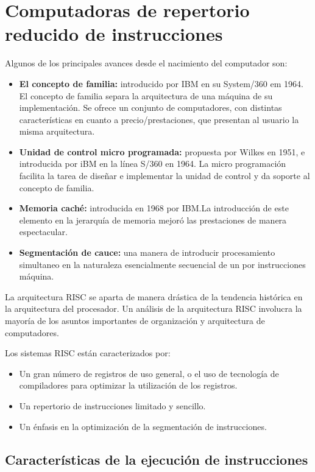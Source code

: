\section{Computadoras de repertorio reducido de instrucciones}

Algunos de los principales avances desde el nacimiento del computador son:

\begin{itemize}
  \item \textbf{El concepto de familia:} introducido por IBM en su System/360 em 1964. El concepto de familia separa la arquitectura de una máquina de su implementación. Se ofrece un conjunto de computadores, con distintas características en cuanto a precio/prestaciones, que presentan al usuario la misma arquitectura.
  \item \textbf{Unidad de control micro programada:} propuesta por Wilkes en 1951, e introducida por iBM en la línea S/360 en 1964. La micro programación facilita la tarea de diseñar e implementar la unidad de control y da soporte al concepto de familia.
  \item \textbf{Memoria caché:} introducida en 1968 por IBM.\@ La introducción de este elemento en la jerarquía de memoria mejoró las prestaciones de manera espectacular.
  \item \textbf{Segmentación de cauce:} una manera de introducir procesamiento simultaneo en la naturaleza esencialmente secuencial de un por instrucciones máquina.
\end{itemize}

La arquitectura RISC se aparta de manera drástica de la tendencia histórica en la arquitectura del procesador. Un análisis de la arquitectura RISC involucra la mayoría de los asuntos importantes de organización y arquitectura de computadores.

Los sistemas RISC están caracterizados por:

\begin{itemize}
  \item Un gran número de registros de uso general, o el uso de tecnología de compiladores para optimizar la utilización de los registros.
  \item Un repertorio de instrucciones limitado y sencillo.
  \item Un énfasis en la optimización de la segmentación de instrucciones.
\end{itemize}

\subsection{Características de la ejecución de instrucciones}

